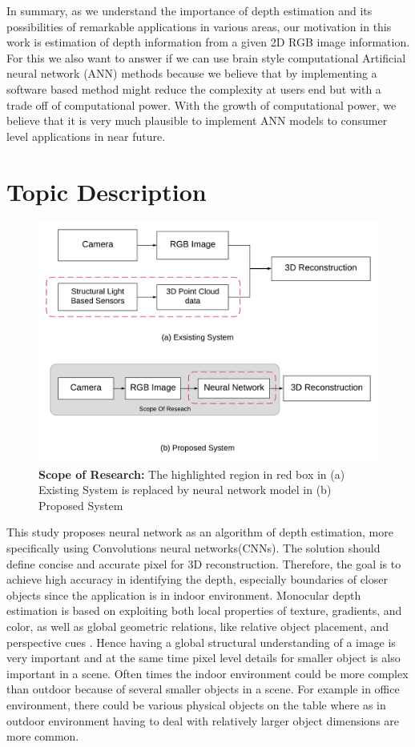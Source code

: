 In summary, as we understand the importance of depth estimation and its possibilities of remarkable applications in various areas, our motivation in this work is estimation of depth information from a given 2D RGB image information. For this we also want to answer if we can use brain style computational Artificial neural network (ANN) methods because we believe that by implementing a software based method might reduce the complexity at users end but with a trade off of computational power. With the growth of computational power, we believe that it is very much plausible to implement ANN models to consumer level applications in near future.

\section{Topic Description}
\label{Chapeter1:Topic_Description}
\begin{figure}[h]
    \centering
    \includegraphics[width = 12cm]{Figures/idea.png}
    \caption{\textbf{Scope of Research:} The highlighted region in red box in (a) Existing System is replaced by neural network model in (b) Proposed System }
    \label{fig:Proposed_Model}
\end{figure}{}
This study proposes neural network as an algorithm of depth estimation, more specifically using Convolutions neural networks(CNNs). The solution should define concise and accurate pixel for 3D reconstruction. Therefore, the goal is to achieve high accuracy in identifying the depth, especially boundaries of closer objects since the application is in indoor environment.  Monocular depth estimation is based on exploiting both local properties of texture, gradients, and color, as well as global geometric relations, like relative object placement, and perspective cues \cite{saxena2006learning}. Hence having a global structural understanding of a image is very important and at the same time pixel level details for smaller object is also important in a scene. Often times the indoor environment could be more complex than outdoor because of several smaller objects in a scene. For example in office environment, there could be various physical objects on the table where as in outdoor environment having to deal with relatively larger object dimensions are more common.  

